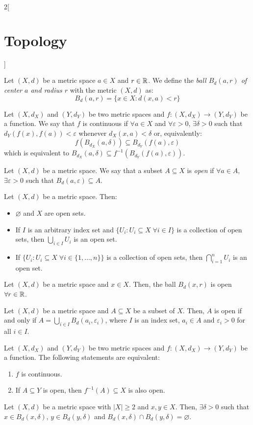 \documentclass[../../../main.tex]{subfiles}
\begin{document}
\begin{multicols}{2}[\section{Topology}]
  \begin{definition}
    Let $(X,d)$ be a metric space $a\in X$ and $r\in\mathbb{R}$. We define the \textit{ball $B_d(a,r)$ of center $a$ and radius $r$} with the metric $(X,d)$ as: $$B_d(a,r)=\{x\in X:d(x,a)<r\}$$
  \end{definition}
  \begin{definition}
    Let $(X,d_X)$ and $(Y,d_Y)$ be two metric spaces and $f:(X,d_X)\rightarrow(Y,d_Y)$ be a function. We say that $f$ is continuous if $\forall a\in X$ and $\forall\varepsilon>0$, $\exists\delta>0$ such that $d_Y(f(x),f(a))<\varepsilon$ whenever $d_X(x,a)<\delta$ or, equivalently: $$f(B_{d_X}(a,\delta))\subseteq B_{d_Y}(f(a),\varepsilon)$$ which is equivalent to $B_{d_X}(a,\delta)\subseteq f^{-1}\left(B_{d_Y}(f(a),\varepsilon)\right)$.
  \end{definition}
  \begin{definition}
    Let $(X,d)$ be a metric space. We say that a subset $A\subseteq X$ is \textit{open} if $\forall a\in A$, $\exists\varepsilon>0$ such that $B_d(a,\varepsilon)\subseteq A$.
  \end{definition}
  \begin{prop}
    Let $(X,d)$ be a metric space. Then:
    \begin{itemize}
      \item $\varnothing$ and $X$ are open sets.
      \item If $I$ is an arbitrary index set and $\{U_i:U_i\subseteq X\;\forall i\in I\}$ is a collection of open sets, then $\bigcup_{i\in I}U_i$ is an open set.
      \item If $\{U_i:U_i\subseteq X\;\forall i\in \{1,\ldots,n\}\}$ is a collection of open sets, then $\bigcap_{i=1}^nU_i$ is an open set.
    \end{itemize}
  \end{prop}
  \begin{prop}
    Let $(X,d)$ be a metric space and $x\in X$. Then, the ball $B_d(x,r)$ is open $\forall r\in\mathbb{R}$.
  \end{prop}
  \begin{prop}
    Let $(X,d)$ be a metric space and $A\subseteq X$ be a subset of $X$. Then, $A$ is open if and only if $A=\bigcup_{i\in I}B_d(a_i,\varepsilon_i)$, where $I$ is an index set, $a_i\in A$ and $\varepsilon_i>0$ for all $i\in I$.
  \end{prop}
  \begin{theorem}
    Let $(X,d_X)$ and $(Y,d_Y)$ be two metric spaces and $f:(X,d_X)\rightarrow(Y,d_Y)$ be a function. The following statements are equivalent:
    \begin{enumerate}
      \item $f$ is continuous.
      \item If $A\subseteq Y$ is open, then $f^{-1}(A)\subseteq X$ is also open.
    \end{enumerate}
  \end{theorem}
  \begin{prop}
    Let $(X,d)$ be a metric space with $|X|\geq 2$ and $x,y\in X$. Then, $\exists\delta>0$ such that $x\in B_d(x,\delta)$, $y\in B_d(y,\delta)$ and $B_d(x,\delta)\cap B_d(y,\delta)=\varnothing$.
  \end{prop}

\end{multicols}
\end{document}
